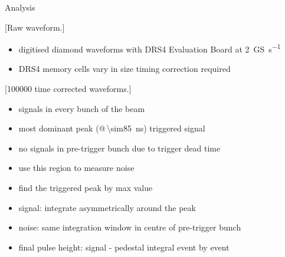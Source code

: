 \begin{block}{Analysis}
	
	[Raw waveform.]
	
	\begin{itemize}
		\item digitised diamond waveforms with DRS4 Evaluation Board at \SI{2}{\giga S\per\second} 
		\item DRS4 memory cells vary in size \ra timing correction required
	\end{itemize}

	[100000 time corrected waveforms.]
	
	\begin{itemize}
		\item signals in every bunch of the beam
		\item most dominant peak (@\,\SI{\sim85}{\nano\second}) \ra triggered signal
		\item no signals in pre-trigger bunch due to trigger dead time
		\item use this region to measure noise
	\end{itemize}
	
	
	\begin{itemize}
		\item find the triggered peak by max value
		\item signal: integrate asymmetrically around the peak
		\item noise: same integration window in centre of pre-trigger bunch
		\item final pulse height: signal - pedestal integral event by event
	\end{itemize}


\end{block}
